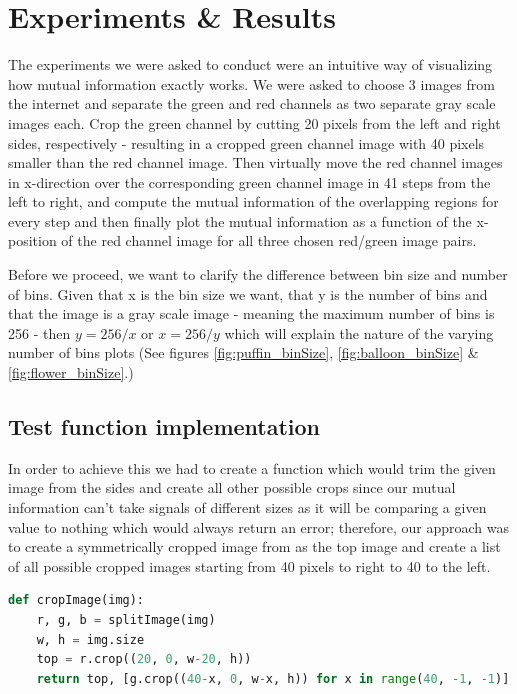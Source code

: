 \documentclass{article}
\begin{document}
\section{Experiments \& Results}
\vspace{2mm}
\begin{flushleft}
The experiments we were asked to conduct were an intuitive way of visualizing how mutual information exactly works. We were asked to choose 3 images from the internet and separate the green and red channels as two separate gray scale images each. Crop the green channel by cutting 20 pixels from the left and right sides, respectively - resulting in a cropped green channel image with 40 pixels smaller than the red channel image. Then virtually move the red channel images in x-direction over the corresponding green channel image in 41 steps from the left to right, and compute the mutual information of the overlapping regions for every step and then finally plot the mutual information as a function of the x-position of the red channel image for all three chosen red/green image pairs. \newline

Before we proceed, we want to clarify the difference between bin size and number of bins. Given that x is the bin size we want, that y is the number of bins and that the image is a gray scale image - meaning the maximum number of bins is 256 - then $y = 256/x$ or $x = 256/y$ which will explain the nature of the varying number of bins plots (See figures \ref{fig:puffin_binSize}, \ref{fig:balloon_binSize} \& \ref{fig:flower_binSize}.)

\subsection{Test function implementation}
\vspace{2mm}
\begin{flushleft}
In order to achieve this we had to create a function which would trim the given image from the sides and create all other possible crops since our mutual information can't take signals of different sizes as it will be comparing a given value to nothing which would always return an error; therefore, our approach was to create a symmetrically cropped image from as the top image and create a list of all possible cropped images starting from 40 pixels to right to 40 to the left.
\end{flushleft}

\begin{lstlisting}[language=Python, caption=Mutual Information]
def cropImage(img):
    r, g, b = splitImage(img)
    w, h = img.size
    top = r.crop((20, 0, w-20, h))
    return top, [g.crop((40-x, 0, w-x, h)) for x in range(40, -1, -1)]
\end{lstlisting}
\end{flushleft}
\end{document}
